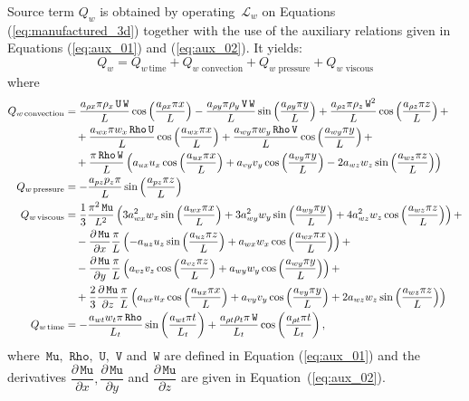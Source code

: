 \documentclass[10pt]{article}
\newcommand{\diff}[2] {\dfrac{\partial #1}{\partial #2}}
\newcommand{\Rho}{\,\mathtt{Rho}}
\newcommand{\U}{\,\mathtt{U}}
\newcommand{\V}{\,\mathtt{V}}
\newcommand{\W}{\,\mathtt{W}}
\newcommand{\Lo}{\,\mathcal{L}}
\newcommand{\Mu}{\,\mathtt{Mu}}
\newcommand{\DMuDx}{\diff{\Mu}{x}}
\newcommand{\DMuDy}{\diff{\Mu}{y}}
\newcommand{\DMuDz}{\diff{\Mu}{z}}
\newcommand{\timee}{\,\text{time}}
\newcommand{\convection}{\,\text{convection}}
\newcommand{\viscous}{\,\text{viscous}}
\newcommand{\pressure}{\,\text{pressure}}
\begin{document}
Source term $Q_w $ is obtained by operating $\Lo_{w }$ on Equations  (\ref{eq:manufactured_3d}) together with the use of the  auxiliary relations given in Equations (\ref{eq:aux_01}) and (\ref{eq:aux_02}). It yields:
\begin{equation*}
Q_w  = Q_{w  \, \text{time}}+Q_{w  \, \convection}+Q_{w  \, \pressure }+Q_{w  \, \viscous }
\end{equation*}
where
\begin{equation*}
\begin{split}
Q_{w \convection} &= \dfrac{a_{\rho x} \pi \rho_x \U \W }{L}\cos\left(\dfrac{a_{\rho x} \pi x}{L}\right) 
-\dfrac{a_{\rho y} \pi \rho_y \V \W }{L}\sin\left(\dfrac{a_{\rho y} \pi y}{L}\right) 
+\dfrac{a_{\rho z} \pi \rho_z \W^2 }{L}\cos\left(\dfrac{a_{\rho z} \pi z}{L}\right) + \\ 
&\quad
+\dfrac{a_{wx} \pi w_x \Rho \U }{L}\cos\left(\dfrac{a_{wx} \pi x}{L}\right)
+\dfrac{a_{wy} \pi w_y \Rho \V }{L}\cos\left(\dfrac{a_{wy} \pi y}{L}\right) + \\ 
&\quad
+ \dfrac{\pi \Rho \W }{L}\left(a_{ux} u_x \cos\left(\dfrac{a_{ux} \pi x}{L}\right)+a_{vy} v_y \cos\left(\dfrac{a_{vy} \pi y}{L}\right)-2 a_{wz} w_z \sin\left(\dfrac{a_{wz} \pi z}{L}\right)\right)  \\\vspace{15pt}
%
Q_{w \pressure} &= -\dfrac{a_{pz} p_z \pi}{L} \sin\left(\dfrac{a_{pz} \pi z}{L}\right) \\ \vspace{15pt}
%
Q_{w \viscous} &= \dfrac{1}{3} \dfrac{\pi^2 \Mu}{L^2}\left(3 a_{wx}^2 w_x \sin\left(\dfrac{a_{wx} \pi x}{L}\right)+3 a_{wy}^2 w_y \sin\left(\dfrac{a_{wy} \pi y}{L}\right)+4 a_{wz}^2 w_z \cos\left(\dfrac{a_{wz} \pi z}{L}\right)\right)  + \\ 
&\quad-\DMuDx \dfrac{\pi}{L} \left(-a_{uz} u_z \sin\left(\dfrac{a_{uz} \pi z}{L}\right)+a_{wx} w_x \cos\left(\dfrac{a_{wx} \pi x}{L}\right)\right)  + \\ 
&\quad-\DMuDy \dfrac{\pi}{L} \left(a_{vz} v_z \cos\left(\dfrac{a_{vz} \pi z}{L}\right)+a_{wy} w_y \cos\left(\dfrac{a_{wy} \pi y}{L}\right)\right)  + \\ 
&\quad+\dfrac{2}{3}  \DMuDz \dfrac{\pi}{L}\left(a_{ux} u_x \cos\left(\dfrac{a_{ux} \pi x}{L}\right)+a_{vy} v_y \cos\left(\dfrac{a_{vy} \pi y}{L}\right)+2 a_{wz} w_z \sin\left(\dfrac{a_{wz} \pi z}{L}\right)\right)  \\ \vspace{15pt}
%
Q_{w \timee} &= -\dfrac{a_{wt} w_t \pi \Rho }{L_t}\sin\left(\dfrac{a_{wt} \pi t}{L_t}\right)  + \dfrac{a_{\rho t} \rho_t \pi \W }{L_t} \cos\left(\dfrac{a_{\rho t} \pi t}{L_t}\right),
\end{split}
\end{equation*}
%
where $\Mu,\, \Rho,\,\U,\,\V$ and $\W$ are defined in Equation (\ref{eq:aux_01}) and the derivatives $\DMuDx,\DMuDy$ and $\DMuDz$ are given in Equation~(\ref{eq:aux_02}).
\end{document}
